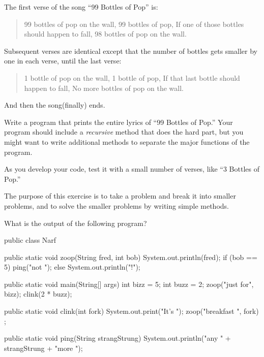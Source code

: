 \documentclass[12pt]{book}
\begin{document}
\begin{exercise}
The first verse of the song ``99 Bottles of Pop'' is:

\begin{quote}
99 bottles of pop on the wall,
99 bottles of pop,
If one of those bottles should happen to fall,
98 bottles of pop on the wall.
\end{quote}

Subsequent verses are identical except that the number of bottles gets smaller by one in each verse, until the last verse:

\begin{quote}
1 bottle of pop on the wall,
1 bottle of pop,
If that last bottle should happen to fall,
No more bottles of pop on the wall.
\end{quote}

And then the song(finally) ends.

Write a program that prints the entire lyrics of ``99 Bottles of Pop.''
Your program should include a {\em recursive} method that does the hard part, but you might want to write additional methods to separate the major functions of the program.

As you develop your code, test it with a small number of verses, like ``3 Bottles of Pop.''

The purpose of this exercise is to take a problem and break it into smaller problems, and to solve the smaller problems by writing simple methods.
\end{exercise}

\begin{exercise}
What is the output of the following program?

\begin{code}
public class Narf {

    public static void zoop(String fred, int bob) {
        System.out.println(fred);
        if (bob == 5) {
            ping("not ");
        } else {
            System.out.println("!");
        }
    }

    public static void main(String[] args) {
        int bizz = 5;
        int buzz = 2;
        zoop("just for", bizz);
        clink(2 * buzz);
    }

    public static void clink(int fork) {
        System.out.print("It's ");
        zoop("breakfast ", fork) ;
    }

    public static void ping(String strangStrung) {
        System.out.println("any " + strangStrung + "more ");
    }
}
\end{code}
\end{exercise}
\end{document}
